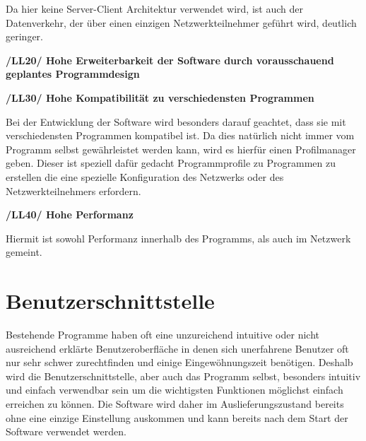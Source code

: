 \documentclass[a4paper,12pt]{scrreprt}
\begin{document}
	Da hier keine Server-Client Architektur verwendet wird, ist auch der Datenverkehr, der über einen einzigen Netzwerkteilnehmer geführt wird, deutlich geringer.
	
\textbf{/LL20/ Hohe Erweiterbarkeit der Software durch vorausschauend geplantes Programmdesign}
	
\textbf{/LL30/ Hohe Kompatibilität zu verschiedensten Programmen}
	
	Bei der Entwicklung der Software wird besonders darauf geachtet, dass sie mit verschiedensten Programmen kompatibel ist. Da dies natürlich nicht immer vom Programm selbst gewährleistet werden kann, wird es hierfür einen Profilmanager geben. Dieser ist speziell dafür gedacht Programmprofile zu Programmen zu erstellen die eine spezielle Konfiguration des Netzwerks oder des Netzwerkteilnehmers erfordern.
	
\textbf{/LL40/ Hohe Performanz}
	
	Hiermit ist sowohl Performanz innerhalb des Programms, als auch im Netzwerk gemeint.
	
	
	
	
\chapter{Benutzerschnittstelle}
	Bestehende Programme haben oft eine unzureichend intuitive oder nicht ausreichend erklärte Benutzeroberfläche in denen sich unerfahrene Benutzer oft nur sehr schwer zurechtfinden und einige Eingewöhnungszeit benötigen. Deshalb wird die Benutzerschnittstelle, aber auch das Programm selbst, besonders intuitiv und einfach verwendbar sein um die wichtigsten Funktionen möglichst einfach erreichen zu können. Die Software wird daher im Auslieferungszustand bereits ohne eine einzige Einstellung auskommen und kann bereits nach dem Start der Software verwendet werden.
	
	
	
\end{document}
